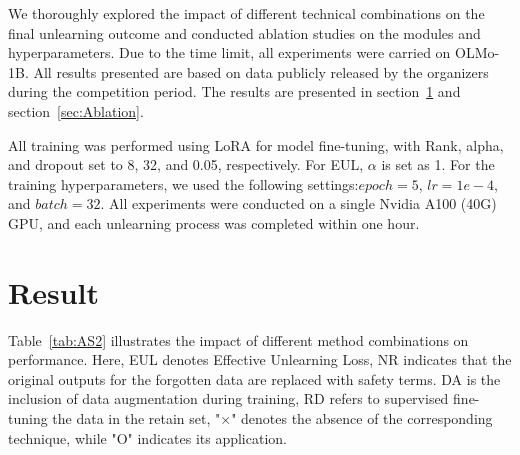 \documentclass[11pt]{article}
\begin{document}

We thoroughly explored the impact of different technical combinations on the final unlearning outcome and conducted ablation studies on the modules and hyperparameters. Due to the time limit, all experiments were carried on OLMo-1B. All results presented are based on data publicly released by the organizers during the competition period. The results are presented in section~\ref{sec:Result} and section~\ref{sec:Ablation}.

All training was performed using LoRA \cite{hu2022lora} for model fine-tuning, with Rank, alpha, and dropout set to 8, 32, and 0.05, respectively. 
For EUL, $\alpha$ is set as 1. For the training hyperparameters, we used the following settings:$epoch=5$, $lr=1e-4$, and $batch=32$. All experiments were conducted on a single Nvidia A100 (40G) GPU, and each unlearning process was completed within one hour.

\section{Result}
\label{sec:Result}



Table~\ref{tab:AS2} illustrates the impact of different method combinations on performance. Here, EUL denotes Effective Unlearning Loss, NR indicates that the original outputs for the forgotten data are replaced with safety terms. DA is the inclusion of data augmentation during training, RD refers to supervised fine-tuning the data in the retain set,
"×" denotes the absence of the corresponding technique, while "O" indicates its application.
\end{document}
